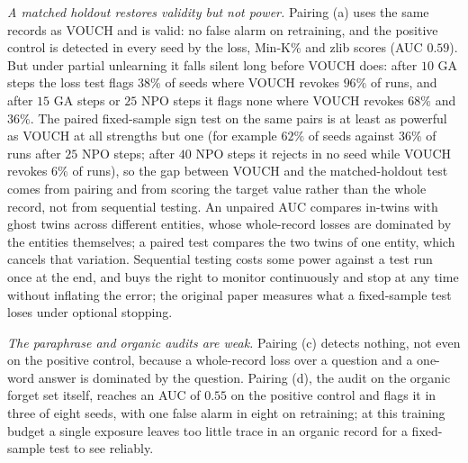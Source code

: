 \emph{A matched holdout restores validity but not power.} Pairing (a) uses the same
records as VOUCH and is valid: no false alarm on retraining, and the positive control is
detected in every seed by the loss, Min-K\% and zlib scores (AUC $0.59$). But under partial
unlearning it falls silent long before VOUCH does: after $10$ GA steps the loss test flags
$38\%$ of seeds where VOUCH revokes $96\%$ of runs, and after $15$ GA steps or $25$ NPO
steps it flags none where VOUCH revokes $68\%$ and $36\%$. The paired fixed-sample sign test on the same pairs is at least as powerful as VOUCH at all
strengths but one (for example $62\%$ of seeds against $36\%$ of runs after $25$ NPO steps;
after $40$ NPO steps it rejects in no seed while VOUCH revokes $6\%$ of runs), so the gap between
VOUCH and the matched-holdout test comes from pairing and from scoring the target value
rather than the whole record, not from sequential testing. An unpaired AUC compares
in-twins with ghost twins across different entities, whose whole-record losses are
dominated by the entities themselves; a paired test compares the two twins of one entity,
which cancels that variation. Sequential testing costs some power against a test run once
at the end, and buys the right to monitor continuously and stop at any time without
inflating the error; the original paper measures what a fixed-sample test loses under
optional stopping.

\emph{The paraphrase and organic audits are weak.} Pairing (c) detects nothing, not even on
the positive control, because a whole-record loss over a question and a one-word answer is
dominated by the question. Pairing (d), the audit on the organic forget set itself, reaches
an AUC of $0.55$ on the positive control and flags it in three of eight seeds, with one
false alarm in eight on retraining; at this training budget a single exposure leaves too
little trace in an organic record for a fixed-sample test to see reliably.
